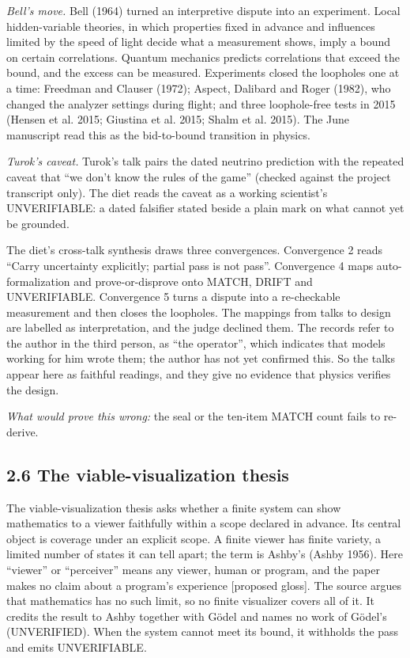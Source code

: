\documentclass[11pt]{article}
\begin{document}
\emph{Bell's move.} Bell (1964) turned an interpretive dispute into an experiment. Local hidden-variable theories, in which properties fixed in advance and influences limited by the speed of light decide what a measurement shows, imply a bound on certain correlations. Quantum mechanics predicts correlations that exceed the bound, and the excess can be measured. Experiments closed the loopholes one at a time: Freedman and Clauser (1972); Aspect, Dalibard and Roger (1982), who changed the analyzer settings during flight; and three loophole-free tests in 2015 (Hensen et al. 2015; Giustina et al. 2015; Shalm et al. 2015). The June manuscript read this as the bid-to-bound transition in physics.

\emph{Turok's caveat.} Turok's talk pairs the dated neutrino prediction with the repeated caveat that ``we don't know the rules of the game'' (checked against the project transcript only). The diet reads the caveat as a working scientist's UNVERIFIABLE: a dated falsifier stated beside a plain mark on what cannot yet be grounded.

The diet's cross-talk synthesis draws three convergences. Convergence 2 reads ``Carry uncertainty explicitly; partial pass is not pass''. Convergence 4 maps auto-formalization and prove-or-disprove onto MATCH, DRIFT and UNVERIFIABLE. Convergence 5 turns a dispute into a re-checkable measurement and then closes the loopholes. The mappings from talks to design are labelled as interpretation, and the judge declined them. The records refer to the author in the third person, as ``the operator'', which indicates that models working for him wrote them; the author has not yet confirmed this. So the talks appear here as faithful readings, and they give no evidence that physics verifies the design.

\emph{What would prove this wrong:} the seal or the ten-item MATCH count fails to re-derive.

\subsection*{2.6 The viable-visualization thesis}

The viable-visualization thesis asks whether a finite system can show mathematics to a viewer faithfully within a scope declared in advance. Its central object is coverage under an explicit scope. A finite viewer has finite variety, a limited number of states it can tell apart; the term is Ashby's (Ashby 1956). Here ``viewer'' or ``perceiver'' means any viewer, human or program, and the paper makes no claim about a program's experience [proposed gloss]. The source argues that mathematics has no such limit, so no finite visualizer covers all of it. It credits the result to Ashby together with Gödel and names no work of Gödel's (UNVERIFIED). When the system cannot meet its bound, it withholds the pass and emits UNVERIFIABLE.
\end{document}
